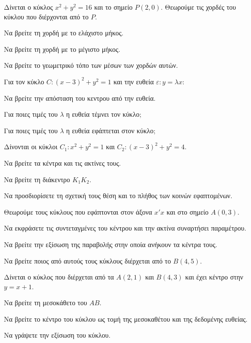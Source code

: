\documentclass[11pt,a4paper,modern]{FFExercises}
\begin{document}
\askhsh
Δίνεται ο κύκλος $x^2 + y^2 = 16$ και το σημείο $P(2,0)$. Θεωρούμε τις χορδές του κύκλου που διέρχονται από το $P$.
\begin{alist}
    \item Να βρείτε τη χορδή με το ελάχιστο μήκος.
    \item Να βρείτε τη χορδή με το μέγιστο μήκος.
    \item Να βρείτε το γεωμετρικό τόπο των μέσων των χορδών αυτών.
\end{alist}

\askhsh
Για τον κύκλο $C: (x-3)^2 + y^2 = 1$ και την ευθεία $\varepsilon: y = \lambda x$:
\begin{alist}
    \item Να βρείτε την απόσταση του κεντρου από την ευθεία.
    \item Για ποιες τιμές του $\lambda$ η ευθεία τέμνει τον κύκλο;
    \item Για ποιες τιμές του $\lambda$ η ευθεία εφάπτεται στον κύκλο;
\end{alist}

\askhsh
Δίνονται οι κύκλοι $C_1: x^2+y^2=1$ και $C_2: (x-3)^2+y^2=4$.
\begin{alist}
    \item Να βρείτε τα κέντρα και τις ακτίνες τους.
    \item Να βρείτε τη διάκεντρο $K_1K_2$.
    \item Να προσδιορίσετε τη σχετική τους θέση και το πλήθος των κοινών εφαπτομένων.
\end{alist}

\askhsh
Θεωρούμε τους κύκλους που εφάπτονται στον άξονα $x'x$ και στο σημείο $A(0,3)$.
\begin{alist}
    \item Να εκφράσετε τις συντεταγμένες του κέντρου και την ακτίνα συναρτήσει παραμέτρου.
    \item Να βρείτε την εξίσωση της παραβολής στην οποία ανήκουν τα κέντρα τους.
    \item Να βρείτε ποιος από αυτούς τους κύκλους διέρχεται από το $B(4,5)$.
\end{alist}

\askhsh
Δίνεται ο κύκλος που διέρχεται από τα $A(2,1)$ και $B(4,3)$ και έχει κέντρο στην $y=x+1$.
\begin{alist}
    \item Να βρείτε τη μεσοκάθετο του $AB$.
    \item Να βρείτε το κέντρο του κύκλου ως τομή της μεσοκαθέτου και της δεδομένης ευθείας.
    \item Να γράψετε την εξίσωση του κύκλου.
\end{alist}
\end{document}
